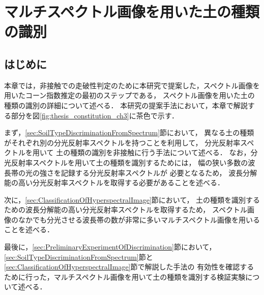 \chapter{マルチスペクトル画像を用いた土の種類の識別}
\thispagestyle{empty}
\label{ch:SoilTypeDiscrimination}
\minitoc

\newpage
\section{はじめに}
本章では，非接触での走破性判定のために本研究で提案した，スペクトル画像を用いたコーン指数推定の最初のステップである，
スペクトル画像を用いた土の種類の識別の詳細について述べる．
本研究の提案手法において，本章で解説する部分を図\ref{fig:thesis_constitution_ch3}に茶色で示す．


まず，\ref{sec:SoilTypeDiscriminationFromSpectrum}節において，
異なる土の種類がそれぞれ別の分光反射率スペクトルを持つことを利用して，
分光反射率スペクトルを用いて
土の種類の識別を非接触に行う手法について述べる．
なお，分光反射率スペクトルを用いて土の種類を識別するためには，
幅の狭い多数の波長帯の光の強さを記録する分光反射率スペクトルが
必要となるため，
波長分解能の高い分光反射率スペクトルを取得する必要があることを述べる．

次に，\ref{sec:ClassificationOfHyperspectralImage}節において，
土の種類を識別するための波長分解能の高い分光反射率スペクトルを取得するため，
スペクトル画像のなかでも分光させる波長帯の数が非常に多いマルチスペクトル画像を用いることを述べる．

最後に，\ref{sec:PreliminaryExperimentOfDiscrimination}節において，
\ref{sec:SoilTypeDiscriminationFromSpectrum}節と\ref{sec:ClassificationOfHyperspectralImage}節で解説した手法の
有効性を確認するために行った，マルチスペクトル画像を用いて土の種類を識別する検証実験について述べる．

